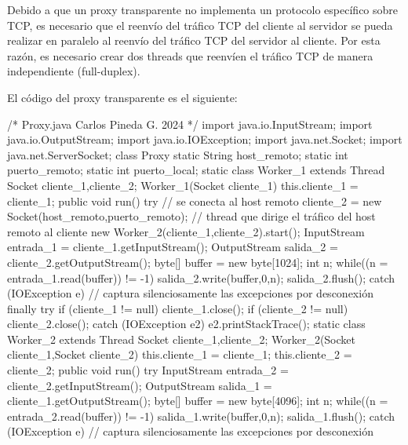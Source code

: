 Debido a que un proxy transparente no implementa un protocolo específico sobre TCP, es necesario que el reenvío del tráfico TCP del cliente al servidor se pueda realizar en paralelo al reenvío del tráfico TCP del servidor al cliente. Por esta razón, es necesario crear dos threads que reenvíen el tráfico TCP de manera independiente (full-duplex).

El código del proxy transparente es el siguiente:

\begin{SourceCode}
/*
  Proxy.java
  Carlos Pineda G. 2024
*/
import java.io.InputStream;
import java.io.OutputStream;
import java.io.IOException;
import java.net.Socket;
import java.net.ServerSocket;
class Proxy
{
  static String host_remoto;
  static int puerto_remoto;
  static int puerto_local;
  static class Worker_1 extends Thread
  {
    Socket cliente_1,cliente_2;
    Worker_1(Socket cliente_1)
    {
      this.cliente_1 = cliente_1;
    }
    public void run()
    {
      try
      {
        // se conecta al host remoto
        cliente_2 = new Socket(host_remoto,puerto_remoto);
        // thread que dirige el tráfico del host remoto al cliente
        new Worker_2(cliente_1,cliente_2).start();
        InputStream entrada_1 = cliente_1.getInputStream();
        OutputStream salida_2 = cliente_2.getOutputStream();
        byte[] buffer = new byte[1024];
        int n;
        while((n = entrada_1.read(buffer)) != -1)
        {
          salida_2.write(buffer,0,n);
          salida_2.flush();
        }
      }
      catch (IOException e)
      {
        // captura silenciosamente las excepciones por desconexión
      }
      finally
      {
        try
        {
          if (cliente_1 != null) cliente_1.close();
          if (cliente_2 != null) cliente_2.close();
        }
        catch (IOException e2)
        {
          e2.printStackTrace();
        }
      }
    }
  }
  static class Worker_2 extends Thread
  {
    Socket cliente_1,cliente_2;
    Worker_2(Socket cliente_1,Socket cliente_2)
    {
      this.cliente_1 = cliente_1;
      this.cliente_2 = cliente_2;
    }
    public void run()
    {
      try
      {
        InputStream entrada_2 = cliente_2.getInputStream();
        OutputStream salida_1 = cliente_1.getOutputStream();
        byte[] buffer = new byte[4096];
        int n;
        while((n = entrada_2.read(buffer)) != -1)
        {
          salida_1.write(buffer,0,n);
          salida_1.flush();
        } 
      }
      catch (IOException e)
      {
        // captura silenciosamente las excepciones por desconexión
      }
}}}
\end{SourceCode}
